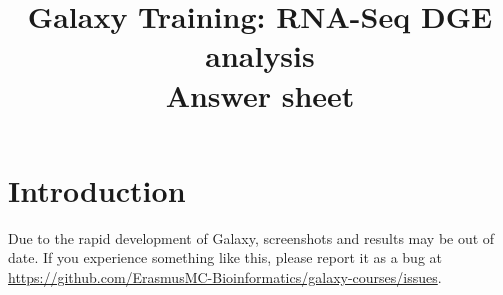 \documentclass[11pt,a4paper]{article}
\begin{document}
\title{ \textit{\institute}\text{ }Galaxy Training: RNA-Seq DGE analysis \\
{ \large Answer sheet}}

\author{ \authors }
\maketitle



\section*{Introduction}
Due to the rapid development of Galaxy, screenshots and results may be out of date. If you experience something like this, please report it as a bug at \url{https://github.com/ErasmusMC-Bioinformatics/galaxy-courses/issues}.






\tuxedofalse
\iftuxedo
	
\else
	
\fi




%
%


\vspace{-1.5em}

\end{document}
